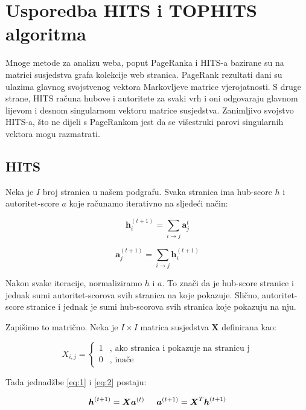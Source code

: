 \documentclass[11pt]{article}
\begin{document}
\newpage
\section{Usporedba HITS i TOPHITS algoritma}
Mnoge metode za analizu weba, poput PageRanka i HITS-a bazirane su na matrici susjedstva grafa kolekcije web stranica. PageRank rezultati dani su ulazima glavnog svojstvenog vektora Markovljeve matrice vjerojatnosti. S druge strane, HITS računa hubove i autoritete za svaki vrh i oni odgovaraju glavnom lijevom i desnom singularnom vektoru matrice susjedstva.
Zanimljivo svojstvo HITS-a, što ne dijeli s PageRankom jest da se višestruki parovi singularnih vektora mogu razmatrati.

\subsection{HITS}
\begin{flushleft}
Neka je $I$ broj stranica u našem podgrafu. Svaka stranica ima hub-score $h$ i autoritet-score $a$ koje računamo iterativno na sljedeći način:
\end{flushleft}
\begin{equation}\label{eq:1}
    \boldsymbol{h}_{i}^{(t+1)} = \displaystyle\sum_{i \rightarrow j} \boldsymbol{a}_j^{t}
\end{equation}

\begin{equation}\label{eq:2}
    \boldsymbol{a}_{j}^{(t+1)} = \displaystyle\sum_{i \rightarrow j} \boldsymbol{h}_i^{(t+1)}
\end{equation}

\begin{flushleft}
Nakon svake iteracije, normaliziramo $h$ i $a$. To znači da je hub-score stranice i jednak sumi autoritet-scorova svih stranica na koje pokazuje. Slično, autoritet-score stranice i jednak je sumi hub-scorova svih stranica koje pokazuju na nju.
\end{flushleft}

\begin{flushleft}
Zapišimo to matrično. Neka je $I \times I$ matrica susjedstva $\boldsymbol{X}$ definirana  kao:
\end{flushleft}
\begin{equation}
    X_{i,j} =  \left\{
	\begin{array}{ll}
		1  & \mbox{, ako stranica i pokazuje na stranicu j} \\
		0 & \mbox{, inače }
	\end{array}
\right.
\end{equation}
\begin{flushleft}
Tada jednadžbe \ref{eq:1} i \ref{eq:2} postaju:
\end{flushleft}
\begin{equation}
    \boldsymbol{h}^{(t+1)} = \boldsymbol{X} \boldsymbol{a}^{(t)} \hspace{0.5cm}
    \boldsymbol{a}^{(t+1)} = \boldsymbol{X}^{T} \boldsymbol{h}^{(t+1)}
\end{equation}
\end{document}
